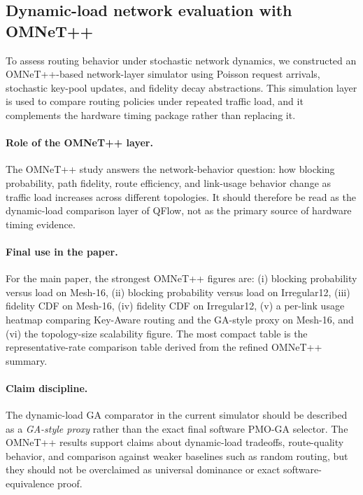 \subsection{Dynamic-load network evaluation with OMNeT++}

To assess routing behavior under stochastic network dynamics, we constructed an OMNeT++-based network-layer simulator using Poisson request arrivals, stochastic key-pool updates, and fidelity decay abstractions. This simulation layer is used to compare routing policies under repeated traffic load, and it complements the hardware timing package rather than replacing it.

\paragraph{Role of the OMNeT++ layer.}
The OMNeT++ study answers the network-behavior question: how blocking probability, path fidelity, route efficiency, and link-usage behavior change as traffic load increases across different topologies. It should therefore be read as the dynamic-load comparison layer of QFlow, not as the primary source of hardware timing evidence.

\paragraph{Final use in the paper.}
For the main paper, the strongest OMNeT++ figures are:
(i) blocking probability versus load on Mesh-16,
(ii) blocking probability versus load on Irregular12,
(iii) fidelity CDF on Mesh-16,
(iv) fidelity CDF on Irregular12,
(v) a per-link usage heatmap comparing Key-Aware routing and the GA-style proxy on Mesh-16, and
(vi) the topology-size scalability figure.
The most compact table is the representative-rate comparison table derived from the refined OMNeT++ summary.

\paragraph{Claim discipline.}
The dynamic-load GA comparator in the current simulator should be described as a \emph{GA-style proxy} rather than the exact final software PMO-GA selector. The OMNeT++ results support claims about dynamic-load tradeoffs, route-quality behavior, and comparison against weaker baselines such as random routing, but they should not be overclaimed as universal dominance or exact software-equivalence proof.
